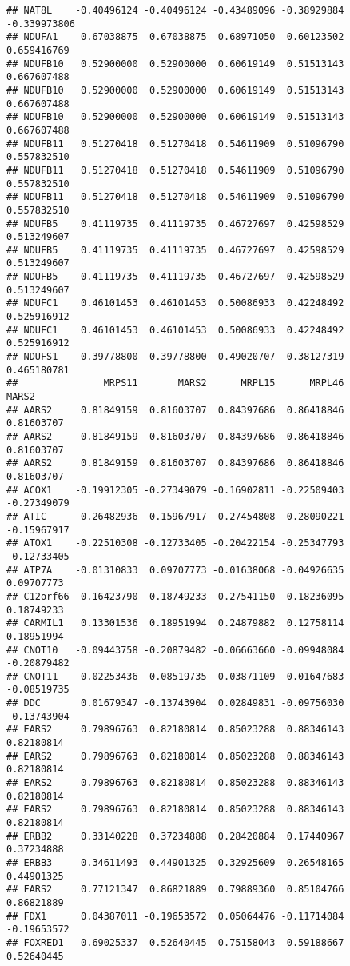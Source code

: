 \documentclass[
]{article}
\begin{document}
\begin{verbatim}
## NAT8L    -0.40496124 -0.40496124 -0.43489096 -0.38929884 -0.339973806
## NDUFA1    0.67038875  0.67038875  0.68971050  0.60123502  0.659416769
## NDUFB10   0.52900000  0.52900000  0.60619149  0.51513143  0.667607488
## NDUFB10   0.52900000  0.52900000  0.60619149  0.51513143  0.667607488
## NDUFB10   0.52900000  0.52900000  0.60619149  0.51513143  0.667607488
## NDUFB11   0.51270418  0.51270418  0.54611909  0.51096790  0.557832510
## NDUFB11   0.51270418  0.51270418  0.54611909  0.51096790  0.557832510
## NDUFB11   0.51270418  0.51270418  0.54611909  0.51096790  0.557832510
## NDUFB5    0.41119735  0.41119735  0.46727697  0.42598529  0.513249607
## NDUFB5    0.41119735  0.41119735  0.46727697  0.42598529  0.513249607
## NDUFB5    0.41119735  0.41119735  0.46727697  0.42598529  0.513249607
## NDUFC1    0.46101453  0.46101453  0.50086933  0.42248492  0.525916912
## NDUFC1    0.46101453  0.46101453  0.50086933  0.42248492  0.525916912
## NDUFS1    0.39778800  0.39778800  0.49020707  0.38127319  0.465180781
##               MRPS11       MARS2      MRPL15      MRPL46       MARS2
## AARS2     0.81849159  0.81603707  0.84397686  0.86418846  0.81603707
## AARS2     0.81849159  0.81603707  0.84397686  0.86418846  0.81603707
## AARS2     0.81849159  0.81603707  0.84397686  0.86418846  0.81603707
## ACOX1    -0.19912305 -0.27349079 -0.16902811 -0.22509403 -0.27349079
## ATIC     -0.26482936 -0.15967917 -0.27454808 -0.28090221 -0.15967917
## ATOX1    -0.22510308 -0.12733405 -0.20422154 -0.25347793 -0.12733405
## ATP7A    -0.01310833  0.09707773 -0.01638068 -0.04926635  0.09707773
## C12orf66  0.16423790  0.18749233  0.27541150  0.18236095  0.18749233
## CARMIL1   0.13301536  0.18951994  0.24879882  0.12758114  0.18951994
## CNOT10   -0.09443758 -0.20879482 -0.06663660 -0.09948084 -0.20879482
## CNOT11   -0.02253436 -0.08519735  0.03871109  0.01647683 -0.08519735
## DDC       0.01679347 -0.13743904  0.02849831 -0.09756030 -0.13743904
## EARS2     0.79896763  0.82180814  0.85023288  0.88346143  0.82180814
## EARS2     0.79896763  0.82180814  0.85023288  0.88346143  0.82180814
## EARS2     0.79896763  0.82180814  0.85023288  0.88346143  0.82180814
## EARS2     0.79896763  0.82180814  0.85023288  0.88346143  0.82180814
## ERBB2     0.33140228  0.37234888  0.28420884  0.17440967  0.37234888
## ERBB3     0.34611493  0.44901325  0.32925609  0.26548165  0.44901325
## FARS2     0.77121347  0.86821889  0.79889360  0.85104766  0.86821889
## FDX1      0.04387011 -0.19653572  0.05064476 -0.11714084 -0.19653572
## FOXRED1   0.69025337  0.52640445  0.75158043  0.59188667  0.52640445

\end{verbatim}
\end{document}
